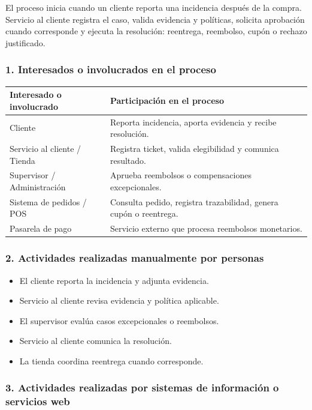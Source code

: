 \documentclass[a4paper,12pt]{article}
\begin{document}
El proceso inicia cuando un cliente reporta una incidencia después de la compra. Servicio al cliente registra el caso, valida evidencia y políticas, solicita aprobación cuando corresponde y ejecuta la resolución: reentrega, reembolso, cupón o rechazo justificado.

\subsubsection*{1. Interesados o involucrados en el proceso}

\begin{longtable}{P{5cm} P{9cm}}
\toprule
\textbf{Interesado o involucrado} & \textbf{Participación en el proceso} \\
\midrule
Cliente & Reporta incidencia, aporta evidencia y recibe resolución. \\
Servicio al cliente / Tienda & Registra ticket, valida elegibilidad y comunica resultado. \\
Supervisor / Administración & Aprueba reembolsos o compensaciones excepcionales. \\
Sistema de pedidos / POS & Consulta pedido, registra trazabilidad, genera cupón o reentrega. \\
Pasarela de pago & Servicio externo que procesa reembolsos monetarios. \\
\bottomrule
\end{longtable}

\subsubsection*{2. Actividades realizadas manualmente por personas}

\begin{itemize}
    \item El cliente reporta la incidencia y adjunta evidencia.
    \item Servicio al cliente revisa evidencia y política aplicable.
    \item El supervisor evalúa casos excepcionales o reembolsos.
    \item Servicio al cliente comunica la resolución.
    \item La tienda coordina reentrega cuando corresponde.
\end{itemize}

\subsubsection*{3. Actividades realizadas por sistemas de información o servicios web}
\end{document}
